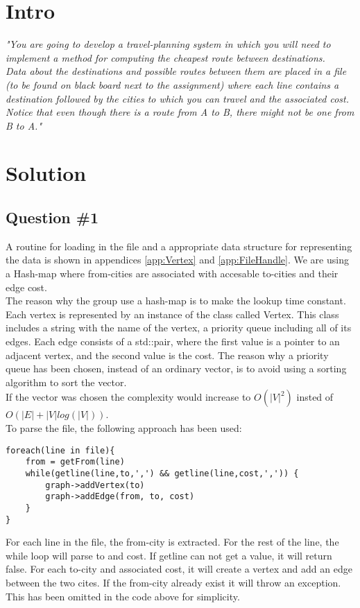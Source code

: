 \section{Intro}
\label{sec:intro}
\textit{"You are going to develop a travel-planning system in which you will need to implement a method for computing the cheapest route between destinations. \\
Data about the destinations and possible routes between them are placed in a file (to be found on black board next to the assignment) where each line contains a destination followed by the cities to which you can travel and the associated cost. \\
Notice that even though there is a route from A to B, there might not be one from B to A."}


\section{Solution}
\subsection{Question \#1}
A routine for loading in the file and a appropriate data structure for representing the data is shown in appendices  \ref{app:Vertex} and \ref{app:FileHandle}. We are using a Hash-map where from-cities are associated with accesable to-cities and their edge cost.\\
The reason why the group use a hash-map is to make the lookup time constant. \\
Each vertex is represented by an instance of the class called Vertex. This class includes a string with the name of the vertex, a priority queue including all of its edges. Each edge consists of a std::pair, where the first value is a pointer to an adjacent vertex, and the second value is the cost. 
The reason why a priority queue has been chosen, instead of an ordinary vector, is to avoid using a sorting algorithm to sort the vector.\\
If the vector was chosen the complexity would increase to \(O(|V|^2)\) insted of \(O(|E| + |V|log(|V|))\). \\
To parse the file, the following approach has been used:
\bigskip
\begin{lstlisting}
foreach(line in file){
	from = getFrom(line)
	while(getline(line,to,',') && getline(line,cost,',')) {
		graph->addVertex(to)
		graph->addEdge(from, to, cost)
	}	
}
\end{lstlisting}
\bigskip
For each line in the file, the from-city is extracted. For the rest of the line, the while loop will parse to and cost. If getline can not get a value, it will return false. For each to-city and associated cost, it will create a vertex and add an edge between the two cites. If the from-city already exist it will throw an exception. This has been omitted in the code above for simplicity.


